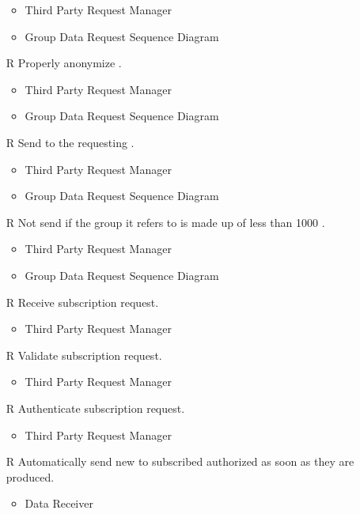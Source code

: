 \begin{itemize}
	\begin{itemize}
		\item Third Party Request Manager
		\item Group Data Request Sequence Diagram
	\end{itemize}
	\item[R\subs{23}]Properly anonymize .
	\begin{itemize}
		\item Third Party Request Manager
		\item Group Data Request Sequence Diagram
	\end{itemize}
	\item[R\subs{24}]Send  to the requesting .
	\begin{itemize}
		\item Third Party Request Manager
		\item Group Data Request Sequence Diagram
	\end{itemize}
	\item[R\subs{25}]Not send  if the group it refers to is made up of less than 1000 .
	\begin{itemize}
		\item Third Party Request Manager
		\item Group Data Request Sequence Diagram
	\end{itemize}
	\item[R\subs{26}]Receive  subscription request.
	\begin{itemize}
		\item Third Party Request Manager
	\end{itemize}
	\item[R\subs{27}]Validate  subscription request.
	\begin{itemize}
		\item Third Party Request Manager
	\end{itemize}
	\item[R\subs{28}]Authenticate  subscription request.
	\begin{itemize}
		\item Third Party Request Manager
	\end{itemize}
	\item[R\subs{29}]Automatically send new  to subscribed authorized  as soon as they are produced.
	\begin{itemize}
		\item Data Receiver

\end{itemize}
\end{itemize}

